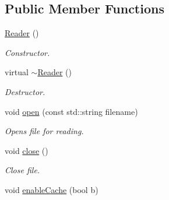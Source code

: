\subsection*{Public Member Functions}
\begin{DoxyCompactItemize}
\item 
\hypertarget{classgdf_1_1_reader_a0cfb8c260168d99aae5eecbfe6ddb23f}{
\hyperlink{classgdf_1_1_reader_a0cfb8c260168d99aae5eecbfe6ddb23f}{Reader} ()}
\label{classgdf_1_1_reader_a0cfb8c260168d99aae5eecbfe6ddb23f}

\begin{DoxyCompactList}\small\item\em Constructor. \item\end{DoxyCompactList}\item 
\hypertarget{classgdf_1_1_reader_a7a30b000e44df279c4524d134b7f5a9c}{
virtual \hyperlink{classgdf_1_1_reader_a7a30b000e44df279c4524d134b7f5a9c}{$\sim$Reader} ()}
\label{classgdf_1_1_reader_a7a30b000e44df279c4524d134b7f5a9c}

\begin{DoxyCompactList}\small\item\em Destructor. \item\end{DoxyCompactList}\item 
\hypertarget{classgdf_1_1_reader_ab0a373e03f5e30bbd727f4d89808fa46}{
void \hyperlink{classgdf_1_1_reader_ab0a373e03f5e30bbd727f4d89808fa46}{open} (const std::string filename)}
\label{classgdf_1_1_reader_ab0a373e03f5e30bbd727f4d89808fa46}

\begin{DoxyCompactList}\small\item\em Opens file for reading. \item\end{DoxyCompactList}\item 
\hypertarget{classgdf_1_1_reader_a9403aed29a6df769dc909025f8231bc8}{
void \hyperlink{classgdf_1_1_reader_a9403aed29a6df769dc909025f8231bc8}{close} ()}
\label{classgdf_1_1_reader_a9403aed29a6df769dc909025f8231bc8}

\begin{DoxyCompactList}\small\item\em Close file. \item\end{DoxyCompactList}\item 
\hypertarget{classgdf_1_1_reader_af409e126981ab1a0c5d106ec49d09179}{
void \hyperlink{classgdf_1_1_reader_af409e126981ab1a0c5d106ec49d09179}{enableCache} (bool b)}
\label{classgdf_1_1_reader_af409e126981ab1a0c5d106ec49d09179}


\end{DoxyCompactItemize}
